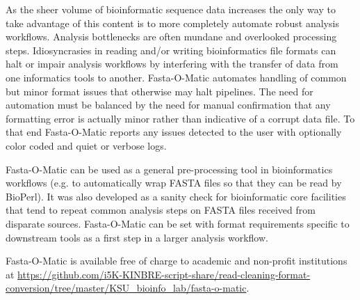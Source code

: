 As the sheer volume of bioinformatic sequence data increases the only way to take advantage of this content is to more completely automate robust analysis workflows. Analysis bottlenecks are often mundane and overlooked processing steps. Idiosyncrasies in reading and/or writing bioinformatics file formats can halt or impair analysis workflows by interfering with the transfer of data from one informatics tools to another. Fasta-O-Matic automates handling of common but minor format issues that otherwise may halt pipelines. The need for automation must be balanced by the need for manual confirmation that any formatting error is actually minor rather than indicative of a corrupt data file. To that end Fasta-O-Matic reports any issues detected to the user with optionally color coded and quiet or verbose logs.

Fasta-O-Matic can be used as a general pre-processing tool in bioinformatics workflows (e.g. to automatically wrap FASTA files so that they can be read by BioPerl). It was also developed as a sanity check for bioinformatic core facilities that tend to repeat common analysis steps on FASTA files received from disparate sources. Fasta-O-Matic can be set with format requirements specific to downstream tools as a first step in a larger analysis workflow.

Fasta-O-Matic is available free of charge to academic and non-profit institutions at \url{https://github.com/i5K-KINBRE-script-share/read-cleaning-format-conversion/tree/master/KSU\_bioinfo\_lab/fasta-o-matic}.
  
  
  
  
  
  
  
  
  